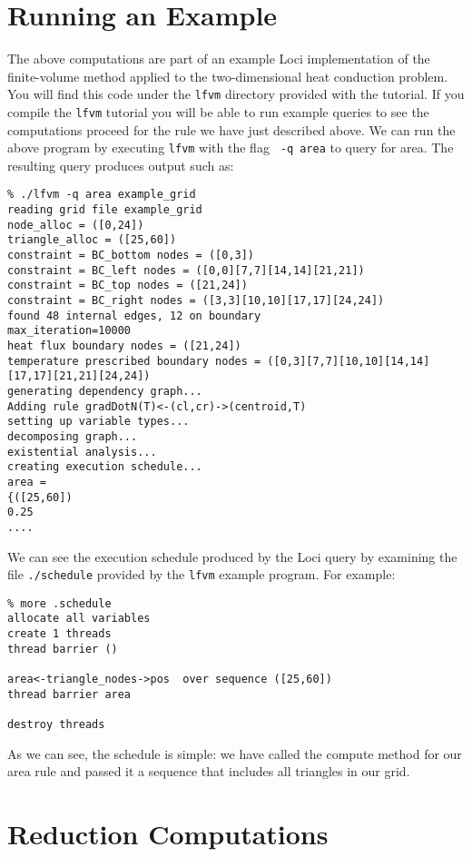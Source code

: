 \documentclass[10pt,epsf]{book}
\begin{document}


\section{Running an Example}

The above computations are part of an example Loci implementation of 
the finite-volume method applied to the two-dimensional heat
conduction problem.  You will find this code under the {\tt lfvm}
directory provided with the tutorial.  If you compile the {\tt lfvm}
tutorial you will be able to run example queries to see the
computations proceed for the rule we have just described above.  We
can run the above program by executing {\tt lfvm} with the flag {\tt
  -q area} to query for area.  The resulting query produces output
such as:

\begin{verbatim}
% ./lfvm -q area example_grid
reading grid file example_grid
node_alloc = ([0,24])
triangle_alloc = ([25,60])
constraint = BC_bottom nodes = ([0,3])
constraint = BC_left nodes = ([0,0][7,7][14,14][21,21])
constraint = BC_top nodes = ([21,24])
constraint = BC_right nodes = ([3,3][10,10][17,17][24,24])
found 48 internal edges, 12 on boundary
max_iteration=10000
heat flux boundary nodes = ([21,24])
temperature prescribed boundary nodes = ([0,3][7,7][10,10][14,14][17,17][21,21][24,24])
generating dependency graph...
Adding rule gradDotN(T)<-(cl,cr)->(centroid,T)
setting up variable types...
decomposing graph...
existential analysis...
creating execution schedule...
area = 
{([25,60])
0.25
....
\end{verbatim}

We can see the execution schedule produced by the Loci query by
examining the file {\tt ./schedule} provided by the {\tt lfvm} example
program.  For example:

\begin{verbatim}
% more .schedule
allocate all variables
create 1 threads
thread barrier ()

area<-triangle_nodes->pos  over sequence ([25,60])
thread barrier area

destroy threads
\end{verbatim}

As we can see, the schedule is simple:  we have called the compute
method for our area rule and passed it a sequence that includes all
triangles in our grid.


\section{Reduction Computations}
\end{document}
